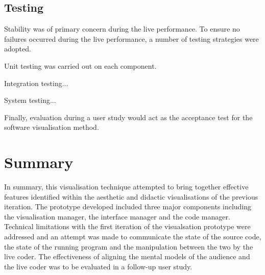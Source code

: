 \subsection{Testing}

Stability was of primary concern during the live performance. To ensure no failures occurred during the live performance, a number of testing strategies were adopted. \more

Unit testing was carried out on each component.

Integration testing... \more

System testing... \more

Finally, evaluation during a user study would act as the acceptance test for the software visualisation method.

\section{Summary}

In summary, this visualisation technique attempted to bring together effective features identified within the aesthetic and didactic visualisations of the previous iteration. The prototype developed included three major components including the visualisation manager, the interface manager and the code manager. Technical limitations with the first iteration of the visualsation prototype were addressed and an attempt was made to communicate the state of the source code, the state of the running program and the manipulation between the two by the live coder. The effectiveness of aligning the mental models of the audience and the live coder was to be evaluated in a follow-up user study.


